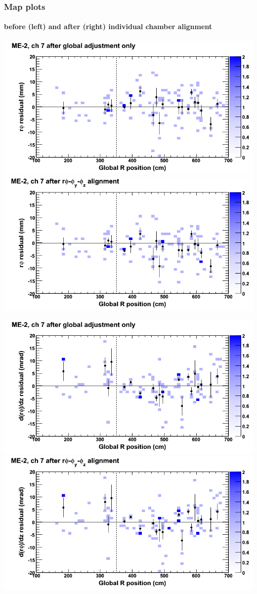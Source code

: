 \documentclass[compress]{beamer}
\begin{document}
\begin{frame}
\frametitle{Map plots}
\framesubtitle{before (left) and after (right) individual chamber alignment}
\includegraphics[width=0.5\linewidth]{ringmapplots_3dof/before_CSCvsr_mem2ch07_x.png} \includegraphics[width=0.5\linewidth]{ringmapplots_3dof/after_CSCvsr_mem2ch07_x.png}

\includegraphics[width=0.5\linewidth]{ringmapplots_3dof/before_CSCvsr_mem2ch07_dxdz.png} \includegraphics[width=0.5\linewidth]{ringmapplots_3dof/after_CSCvsr_mem2ch07_dxdz.png}
\end{frame}
\end{document}
